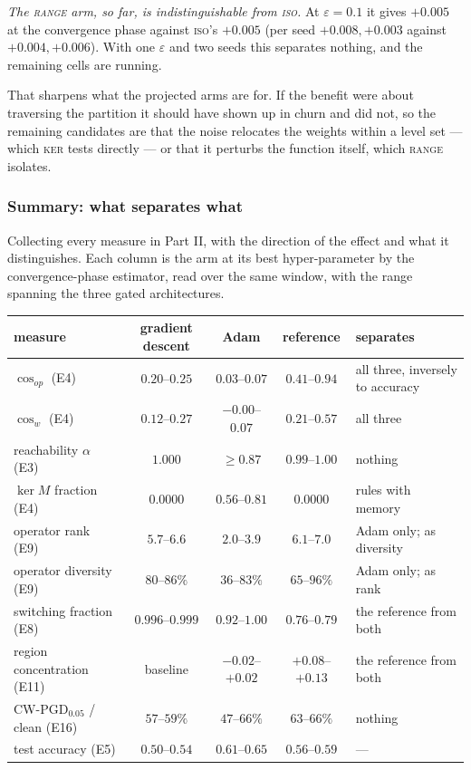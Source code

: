 \documentclass{article} %
\theoremstyle{plain}
\theoremstyle{definition}
\theoremstyle{remark}
\begin{document}
\emph{The \textsc{range} arm, so far, is indistinguishable from \textsc{iso}.} At
$\varepsilon = 0.1$ it gives $+0.005$ at the convergence phase against \textsc{iso}'s $+0.005$
(per seed $+0.008, +0.003$ against $+0.004, +0.006$). With one $\varepsilon$ and two seeds this
separates nothing, and the remaining cells are running.

That sharpens what the projected arms are for. If the benefit were about traversing the partition
it should have shown up in churn and did not, so the remaining candidates are that the noise
relocates the weights within a level set --- which \textsc{ker} tests directly --- or that it
perturbs the function itself, which \textsc{range} isolates.

\subsubsection{Summary: what separates what}
\label{sec:e-summary}

Collecting every measure in Part II, with the direction of the effect and what it distinguishes.
Each column is the arm at its best hyper-parameter by the convergence-phase estimator, read over
the same window, with the range spanning the three gated architectures.

\begin{center}\small
\begin{tabular}{lccc@{\hskip 10pt}l}
\toprule
measure & gradient descent & Adam & reference & separates \\
\midrule
$\cos_{op}$ (E4)            & $0.20$--$0.25$   & $0.03$--$0.07$     & $0.41$--$0.94$     & all three, inversely to accuracy \\
$\cos_w$ (E4)               & $0.12$--$0.27$   & $-0.00$--$0.07$    & $0.21$--$0.57$     & all three \\
reachability $\alpha$ (E3)  & $1.000$          & $\ge 0.87$         & $0.99$--$1.00$     & nothing \\
$\ker M$ fraction (E4)      & $0.0000$         & $0.56$--$0.81$     & $0.0000$           & rules with memory \\
operator rank (E9)          & $5.7$--$6.6$     & $2.0$--$3.9$       & $6.1$--$7.0$       & Adam only; as diversity \\
operator diversity (E9)     & $80$--$86\%$     & $36$--$83\%$       & $65$--$96\%$       & Adam only; as rank \\
switching fraction (E8)     & $0.996$--$0.999$ & $0.92$--$1.00$     & $0.76$--$0.79$     & the reference from both \\
region concentration (E11)  & baseline         & $-0.02$--$+0.02$   & $+0.08$--$+0.13$   & the reference from both \\
CW-PGD$_{0.05}$ / clean (E16) & $57$--$59\%$   & $47$--$66\%$       & $63$--$66\%$       & nothing \\
\midrule
test accuracy (E5)          & $0.50$--$0.54$   & $0.61$--$0.65$     & $0.56$--$0.59$     & --- \\
\bottomrule
\end{tabular}
\end{center}
\end{document}
